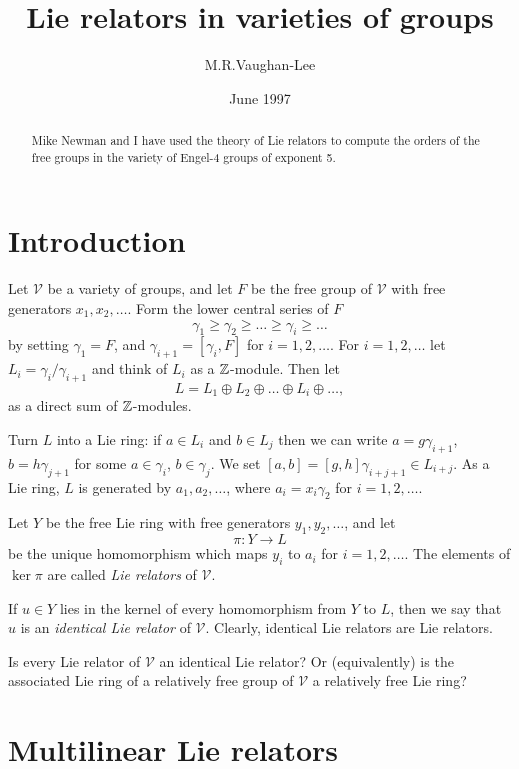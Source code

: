 \documentclass[12pt]{article}
\begin{document}
\author{M.R.Vaughan-Lee}
\title{Lie relators in varieties of groups}
\date{June 1997}
\maketitle

\begin{abstract}
Mike Newman and I have used the theory of Lie relators to compute the orders
of the free groups in the variety of Engel-4 groups of exponent 5.
\end{abstract}

\section{Introduction}

Let $\mathcal{V}$ be a variety of groups, and let $F$ be the free group of $%
\mathcal{V}$ with free generators $x_1,x_2,\ldots $. Form the lower central
series of $F$%
\[
\gamma _1\geq \gamma _2\geq \ldots \geq \gamma _i\geq \ldots 
\]
by setting $\gamma _1=F$, and $\gamma _{i+1}=[\gamma _i,F]$ for $%
i=1,2,\ldots $. For $i=1,2,\ldots $ let $L_i=\gamma _i/\gamma _{i+1}$ and
think of $L_i$ as a $\Bbb{Z}$-module. Then let 
\[
L=L_1\oplus L_2\oplus \ldots \oplus L_i\oplus \ldots , 
\]
as a direct sum of $\Bbb{Z}$-modules.

Turn $L$ into a Lie ring: if $a\in L_i$ and $b\in L_j$ then we can write $%
a=g\gamma _{i+1}$, $b=h\gamma _{j+1}$ for some $a\in \gamma _i$, $b\in
\gamma _j$. We set $[a,b]=[g,h]\gamma _{i+j+1}\in L_{i+j}$. As a Lie ring, $%
L $ is generated by $a_1,a_2,\ldots $, where $a_i=x_i\gamma _2$ for $%
i=1,2,\ldots $.

Let $Y$ be the free Lie ring with free generators $y_1,y_2,\ldots $, and let 
\[
\pi :Y\rightarrow L 
\]
be the unique homomorphism which maps $y_i$ to $a_i$ for $i=1,2,\ldots $.
The elements of $\ker \pi $ are called \emph{Lie relators} of $\mathcal{V}$.

If $u\in Y$ lies in the kernel of every homomorphism from $Y$ to $L$, then
we say that $u$ is an \emph{identical Lie relator} of $\mathcal{V}$.
Clearly, identical Lie relators are Lie relators.\bigskip

{\Large Is every Lie relator of $\mathcal{V}$ an identical Lie relator? Or
(equivalently) is the associated Lie ring of a relatively free group of $%
\mathcal{V}$ a relatively free Lie ring?} \newpage

\section{Multilinear Lie relators}
\end{document}
